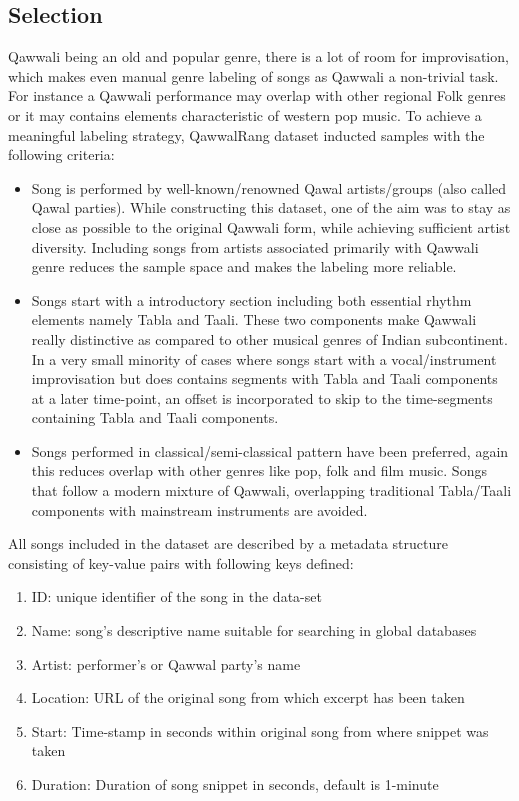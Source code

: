 \documentclass{article}
\begin{document}
\subsection{Selection}

Qawwali being an old and popular genre, there is a lot of room for improvisation, which makes even manual genre labeling of songs as Qawwali a non-trivial task. For instance a Qawwali performance may overlap with other regional Folk genres or it may contains elements characteristic of western pop music. To achieve a meaningful labeling strategy, QawwalRang dataset inducted samples with the following criteria:
\begin{itemize}
\item Song is performed by well-known/renowned Qawal artists/groups (also called Qawal parties). While constructing this dataset, one of the aim was to stay as close as possible to the original Qawwali form, while achieving sufficient artist diversity. Including songs from artists associated primarily with Qawwali genre reduces the sample space and makes the labeling more reliable. 
\item Songs start with a introductory section including both essential rhythm elements namely Tabla and Taali. These two components make Qawwali really distinctive as compared to other musical genres of Indian subcontinent. In a very small minority of cases where songs start with a vocal/instrument improvisation but does contains segments with Tabla and Taali components at a later time-point, an offset is incorporated to skip to the time-segments containing Tabla and Taali components.
\item Songs performed in classical/semi-classical pattern have been preferred, again this reduces overlap with other genres like pop, folk and film music. Songs that follow a modern mixture of Qawwali, overlapping traditional Tabla/Taali components with mainstream instruments are avoided.
\end{itemize}

All songs included in the dataset are described by a metadata structure consisting of key-value pairs with following keys defined:
\begin{enumerate}
\item ID: unique identifier of the song in the data-set
\item Name: song's descriptive name suitable for searching in global databases
\item Artist: performer's or Qawwal party's name
\item Location: URL of the original song from which excerpt has been taken
\item Start: Time-stamp in seconds within original song from where snippet was taken
\item Duration: Duration of song snippet in seconds, default is 1-minute
\end{enumerate}
\end{document}
